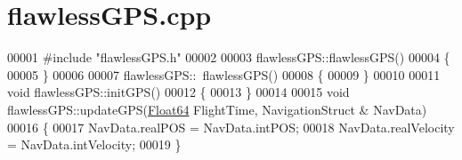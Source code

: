 \hypertarget{flawless_g_p_s_8cpp_source}{}\section{flawless\+G\+P\+S.\+cpp}
\label{flawless_g_p_s_8cpp_source}

\begin{DoxyCode}
00001 \textcolor{preprocessor}{#include "flawlessGPS.h"}
00002 
00003 flawlessGPS::flawlessGPS()
00004 \{
00005 \}
00006 
00007 flawlessGPS::~flawlessGPS()
00008 \{
00009 \}
00010 
00011 \textcolor{keywordtype}{void} flawlessGPS::initGPS()
00012 \{
00013 \}
00014 
00015 \textcolor{keywordtype}{void} flawlessGPS::updateGPS(\hyperlink{group___tools_ga3f1431cb9f76da10f59246d1d743dc2c}{Float64} FlightTime, NavigationStruct & NavData)
00016 \{
00017     NavData.realPOS = NavData.intPOS;
00018     NavData.realVelocity = NavData.intVelocity;
00019 \}
\end{DoxyCode}
